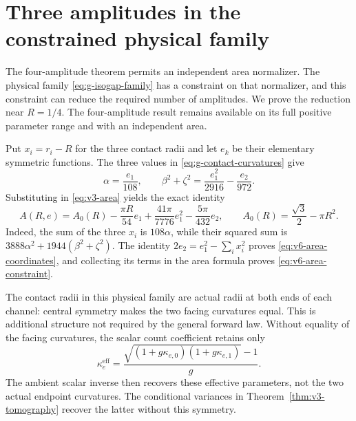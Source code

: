 \section{Three amplitudes in the constrained physical family}
\label{sec:v6-three}
The four-amplitude theorem permits an independent area normalizer. The
physical family \eqref{eq:g-isogap-family} has a constraint on that
normalizer, and this constraint can reduce the required number of
amplitudes. We prove the reduction near $R=1/4$. The four-amplitude
result remains available on its full positive parameter range and
with an independent area.

Put $x_i=r_i-R$ for the three contact radii and let $e_k$ be their
elementary symmetric functions. The three values in
\eqref{eq:g-contact-curvatures} give
\begin{equation}\label{eq:v6-area-coordinates}
 \alpha=\frac{e_1}{108},\qquad
 \beta^2+\zeta^2=\frac{e_1^2}{2916}-\frac{e_2}{972}.
\end{equation}
Substituting in \eqref{eq:v3-area} yields the exact identity
\begin{equation}\label{eq:v6-area-constraint}
 A(R,e)=A_0(R)-\frac{\pi R}{54}e_1
             +\frac{41\pi}{7776}e_1^2-\frac{5\pi}{432}e_2,
 \qquad A_0(R)=\frac{\sqrt3}{2}-\pi R^2.
\end{equation}
Indeed, the sum of the three $x_i$ is $108\alpha$, while their squared
sum is $3888\alpha^2+1944(\beta^2+\zeta^2)$. The identity
$2e_2=e_1^2-\sum_i x_i^2$ proves \eqref{eq:v6-area-coordinates}, and
collecting its terms in the area formula proves
\eqref{eq:v6-area-constraint}.

The contact radii in this physical family are actual radii at both ends
of each channel: central symmetry makes the two facing curvatures equal.
This is additional structure not required by the general forward law.
Without equality of the facing curvatures, the scalar count coefficient
retains only
\begin{equation}\label{eq:v6-effective-curvature}
 \kappa_e^{\mathrm{eff}}=
 \frac{\sqrt{(1+g\kappa_{e,0})(1+g\kappa_{e,1})}-1}{g}.
\end{equation}
The ambient scalar inverse then recovers these effective parameters,
not the two actual endpoint curvatures. The conditional variances in
Theorem~\ref{thm:v3-tomography} recover the latter without this symmetry.


